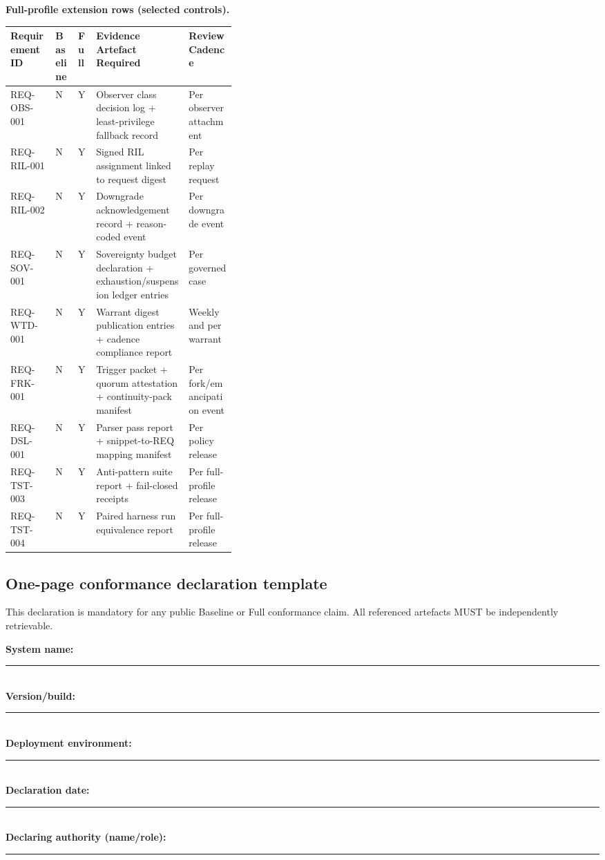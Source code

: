 \documentclass[11pt]{article}
\theoremstyle{definition}
\theoremstyle{plain}
\theoremstyle{remark}
\begin{document}
\textbf{Full-profile extension rows (selected controls).}
\begin{center}
\small
\setlength{\tabcolsep}{7pt}
\renewcommand{\arraystretch}{1.22}
\begin{tabularx}{0.98\linewidth}{p{0.20\linewidth} p{0.10\linewidth} p{0.08\linewidth} Y Y}
\textbf{Requirement ID} & \textbf{Baseline} & \textbf{Full} & \textbf{Evidence Artefact Required} & \textbf{Review Cadence} \\ \hline
{}
REQ-OBS-001 & N & Y & Observer class decision log + least-privilege fallback record & Per observer attachment \\
REQ-RIL-001 & N & Y & Signed RIL assignment linked to request digest & Per replay request \\
REQ-RIL-002 & N & Y & Downgrade acknowledgement record + reason-coded event & Per downgrade event \\
REQ-SOV-001 & N & Y & Sovereignty budget declaration + exhaustion/suspension ledger entries & Per governed case \\
REQ-WTD-001 & N & Y & Warrant digest publication entries + cadence compliance report & Weekly and per warrant \\
REQ-FRK-001 & N & Y & Trigger packet + quorum attestation + continuity-pack manifest & Per fork/emancipation event \\
REQ-DSL-001 & N & Y & Parser pass report + snippet-to-REQ mapping manifest & Per policy release \\
REQ-TST-003 & N & Y & Anti-pattern suite report + fail-closed receipts & Per full-profile release \\
REQ-TST-004 & N & Y & Paired harness run equivalence report & Per full-profile release \\
\end{tabularx}
\end{center}

\clearpage
\subsection{One-page conformance declaration template}
\label{ann:conformance-declaration-template}

This declaration is mandatory for any public Baseline or Full conformance claim.
All referenced artefacts MUST be independently retrievable.

\begingroup
\footnotesize
\textbf{System name:} \rule{0.62\linewidth}{0.4pt} \\
\textbf{Version/build:} \rule{0.62\linewidth}{0.4pt} \\
\textbf{Deployment environment:} \rule{0.52\linewidth}{0.4pt} \\
\textbf{Declaration date:} \rule{0.40\linewidth}{0.4pt} \\
\textbf{Declaring authority (name/role):} \rule{0.44\linewidth}{0.4pt}
\end{document}
